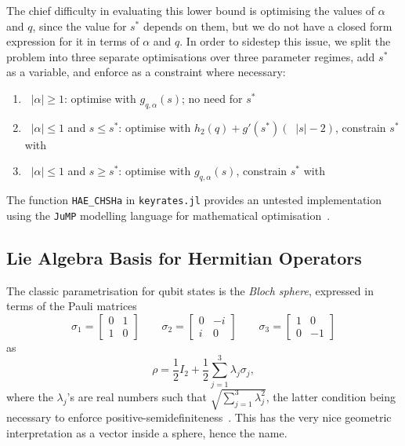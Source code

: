 \documentclass[10pt, a4paper]{article}
\numberwithin{equation}{section} %
\theoremstyle{definition}
\theoremstyle{plain}
\newcommand{\abs}[1]{\mathop{}\left\lvert#1\right\rvert}
\newcommand{\?}{\mathrel{?}} %
\begin{document}
\begin{appendices}
                    The chief difficulty in evaluating this lower bound is optimising the values of \(\alpha\) and \(q\), since the value for \(s^*\) depends on them, but we do not have a closed form expression for it in terms of \(\alpha\) and \(q\). In order to sidestep this issue, we split the problem into three separate optimisations over three parameter regimes, add \(s^*\) as a variable, and enforce  as a constraint where necessary:
                    \begin{enumerate}
                      \item \(\abs{\alpha} \geq 1\): optimise with \(g_{q,\alpha}(s)\); no need for \(s^*\)
                      \item \(\abs{\alpha} \leq 1\) and \(s \leq s^*\): optimise with \(h_2(q) + g'(s^*)(\abs{s}-2)\), constrain \(s^*\) with 
                      \item \(\abs{\alpha} \leq 1\) and \(s \geq s^*\): optimise with \(g_{q,\alpha}(s)\), constrain \(s^*\) with 
                    \end{enumerate}

                    The function \verb`HAE_CHSHa` in \verb`keyrates.jl` provides an untested implementation using the \verb`JuMP` modelling language for mathematical optimisation~\cite{JuMP}.

                    \subsection{Lie Algebra Basis for Hermitian Operators}\label{sec:addtech_liealg}

                    The classic parametrisation for qubit states is the \emph{Bloch sphere}, expressed in terms of the Pauli matrices
                    \begin{equation}
                      \sigma_1 = \begin{bmatrix} 0 & 1 \\ 1 &  0 \end{bmatrix} \qquad \sigma_2 = \begin{bmatrix} 0 & -i \\ i & 0 \end{bmatrix} \qquad \sigma_3 = \begin{bmatrix} 1 & 0 \\ 0 & -1 \end{bmatrix}
                    \end{equation}
                    as
                    \begin{equation}
                      \rho = \frac{1}{2}I_2 + \frac{1}{2} \sum_{j=1}^3 \lambda_j \sigma_j,
                    \end{equation}
                    where the \(\lambda_j\)'s are real numbers such that \(\sqrt{\sum_{j=1}^3 \lambda_j^2}\), the latter condition being necessary to enforce positive-semidefiniteness~\cite{DensMatParam}. This has the very nice geometric interpretation as a vector inside a sphere, hence the name.


\end{appendices}
\end{document}
